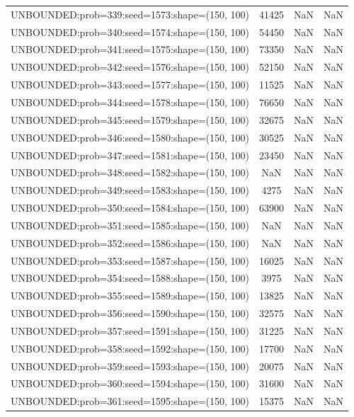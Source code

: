 \begin{longtable}{lccc}
UNBOUNDED:prob=339:seed=1573:shape=(150, 100) & 41425 &   NaN &    NaN \\
UNBOUNDED:prob=340:seed=1574:shape=(150, 100) & 54450 &   NaN &    NaN \\
UNBOUNDED:prob=341:seed=1575:shape=(150, 100) & 73350 &   NaN &    NaN \\
UNBOUNDED:prob=342:seed=1576:shape=(150, 100) & 52150 &   NaN &    NaN \\
UNBOUNDED:prob=343:seed=1577:shape=(150, 100) & 11525 &   NaN &    NaN \\
UNBOUNDED:prob=344:seed=1578:shape=(150, 100) & 76650 &   NaN &    NaN \\
UNBOUNDED:prob=345:seed=1579:shape=(150, 100) & 32675 &   NaN &    NaN \\
UNBOUNDED:prob=346:seed=1580:shape=(150, 100) & 30525 &   NaN &    NaN \\
UNBOUNDED:prob=347:seed=1581:shape=(150, 100) & 23450 &   NaN &    NaN \\
UNBOUNDED:prob=348:seed=1582:shape=(150, 100) &   NaN &   NaN &    NaN \\
UNBOUNDED:prob=349:seed=1583:shape=(150, 100) &  4275 &   NaN &    NaN \\
UNBOUNDED:prob=350:seed=1584:shape=(150, 100) & 63900 &   NaN &    NaN \\
UNBOUNDED:prob=351:seed=1585:shape=(150, 100) &   NaN &   NaN &    NaN \\
UNBOUNDED:prob=352:seed=1586:shape=(150, 100) &   NaN &   NaN &    NaN \\
UNBOUNDED:prob=353:seed=1587:shape=(150, 100) & 16025 &   NaN &    NaN \\
UNBOUNDED:prob=354:seed=1588:shape=(150, 100) &  3975 &   NaN &    NaN \\
UNBOUNDED:prob=355:seed=1589:shape=(150, 100) & 13825 &   NaN &    NaN \\
UNBOUNDED:prob=356:seed=1590:shape=(150, 100) & 32575 &   NaN &    NaN \\
UNBOUNDED:prob=357:seed=1591:shape=(150, 100) & 31225 &   NaN &    NaN \\
UNBOUNDED:prob=358:seed=1592:shape=(150, 100) & 17700 &   NaN &    NaN \\
UNBOUNDED:prob=359:seed=1593:shape=(150, 100) & 20075 &   NaN &    NaN \\
UNBOUNDED:prob=360:seed=1594:shape=(150, 100) & 31600 &   NaN &    NaN \\
UNBOUNDED:prob=361:seed=1595:shape=(150, 100) & 15375 &   NaN &    NaN \\

\end{longtable}
